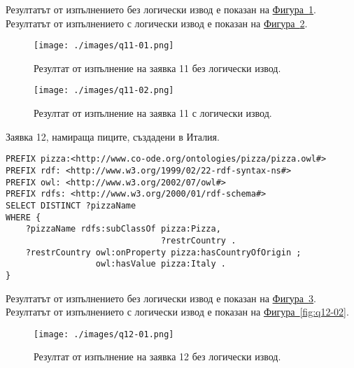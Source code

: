 \documentclass[12pt]{article}
\begin{document}
        Резултатът от изпълнението без логически извод е показан на \hyperref[fig:q11-01]{Фигура~\ref*{fig:q11-01}}.
        Резултатът от изпълнението с логически извод е показан на \hyperref[fig:q11-02]{Фигура~\ref*{fig:q11-02}}.

        \begin{center}
            \begin{figure}
            \centering
                \texttt{[image: ./images/q11-01.png]}
                \caption{Резултат от изпълнение на заявка 11 без логически извод.}
                \label{fig:q11-01}
            \end{figure}
        \end{center}

        \begin{center}
            \begin{figure}
            \centering
                \texttt{[image: ./images/q11-02.png]}
                \caption{Резултат от изпълнение на заявка 11 с логически извод.}
                \label{fig:q11-02}
            \end{figure}
        \end{center}


\clearpage
\pagebreak

        Заявка 12, намираща пиците, създадени в Италия.
        
        \begin{lstlisting}[language=SPARQL,style=sparql]
PREFIX pizza:<http://www.co-ode.org/ontologies/pizza/pizza.owl#>
PREFIX rdf: <http://www.w3.org/1999/02/22-rdf-syntax-ns#>
PREFIX owl: <http://www.w3.org/2002/07/owl#>
PREFIX rdfs: <http://www.w3.org/2000/01/rdf-schema#>
SELECT DISTINCT ?pizzaName
WHERE {
    ?pizzaName rdfs:subClassOf pizza:Pizza,
                               ?restrCountry .
    ?restrCountry owl:onProperty pizza:hasCountryOfOrigin ;
                  owl:hasValue pizza:Italy .
}\end{lstlisting}

        Резултатът от изпълнението без логически извод е показан на \hyperref[fig:q12-01]{Фигура~\ref*{fig:q12-01}}.
        Резултатът от изпълнението с логически извод е показан на \hyperref[fig:q12-02]{Фигура~\ref*{fig:q12-02}}.

        \begin{center}
            \begin{figure}
            \centering
                \texttt{[image: ./images/q12-01.png]}
                \caption{Резултат от изпълнение на заявка 12 без логически извод.}
                \label{fig:q12-01}
            \end{figure}
        \end{center}
\end{document}
